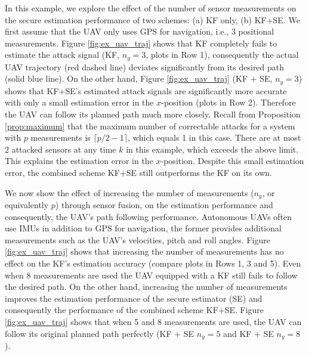 \documentclass[../../thesis.tex]{subfiles}
\begin{document}
In this example, we explore the effect of the number of sensor measurements on the secure estimation performance of two schemes: (a) KF only, (b) KF+SE.
We first assume that the UAV only uses GPS for navigation, i.e., 3 positional measurements. 
Figure \ref{fig:ex_uav_traj} shows that KF completely fails to estimate the attack signal (KF, $n_y = 3$, plots in Row 1), %
consequently the actual UAV trajectory (red dashed line)  deviates significantly from its desired path (solid blue line). %
On the other hand, Figure \ref{fig:ex_uav_traj} (KF + SE, $n_y = 3$) shows that KF+SE's estimated attack signals are significantly more accurate with only a small estimation error in the $x$-position (plots in Row 2). 
Therefore the UAV can follow its planned path much more closely. %
Recall from Proposition \ref{prop:maximum} that the maximum number of correctable attacks for a system with $p$ measurements is $\lceil p/2-1 \rceil$, which equals 1 in this case. There are at most 2 attacked sensors at any time $k$ in this example, which exceeds the above limit. This explains the estimation error in the $x$-position. Despite this small estimation error, the combined scheme KF+SE still outperforms the KF on its own.

We now show the effect of increasing the number of measurements ($n_y$, or equivalently $p$) through sensor fusion, on the estimation performance and consequently, the UAV's path following performance. Autonomous UAVs often use IMUs in addition to GPS for navigation, the former provides additional measurements such as the UAV's velocities, pitch and roll angles. Figure \ref{fig:ex_uav_traj} shows that increasing the number of measurements has no effect on the KF's estimation accuracy (compare plots in Rows 1, 3 and 5). 
Even when 8 measurements are used the UAV equipped with a KF still fails to follow the desired path. %
On the other hand, increasing the number of measurements improves the estimation performance of the secure estimator (SE) and consequently the performance of the combined scheme KF+SE. %
Figure \ref{fig:ex_uav_traj} shows that when 5 and 8 measurements are used, the UAV can follow its original planned
path perfectly (KF + SE $n_y = 5$ and KF + SE $n_y = 8$).
\end{document}
